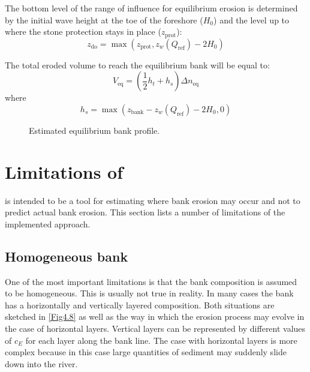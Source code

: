 The bottom level of the range of influence for equilibrium erosion is determined by the initial wave height at the toe of the foreshore ($H_0$) and the level up to where the stone protection stays in place ($z_\text{prot}$):
\begin{equation}
z_\text{do} = \max (z_\text{prot}, z_w(Q_\text{ref}) - 2 H_0 )
\end{equation}	

The total eroded volume to reach the equilibrium bank will be equal to:
\begin{equation}
V_\text{eq} = ( \frac{1}{2} h_t + h_s ) \Delta n_\text{eq}
\end{equation}
where 
\begin{equation}
h_s = \max ( z_\text{bank} - z_w(Q_\text{ref}) - 2 H_0, 0)
\end{equation}

\begin{figure}[!h]
\center
\resizebox{14cm}{!}{
   
}
\caption{Estimated equilibrium bank profile.}
\label{Fig4.7}
\end{figure}

\section{Limitations of \dfastbe} \label{Sec4.7}

\dfastbe is intended to be a tool for estimating where bank erosion may occur and not to predict actual bank erosion.
This section lists a number of limitations of the implemented approach.

\subsection{Homogeneous bank}

One of the most important limitations is that the bank composition is assumed to be homogeneous.
This is usually not true in reality.
In many cases the bank has a horizontally and vertically layered composition.
Both situations are sketched in \autoref{Fig4.8} as well as the way in which the erosion process may evolve in the case of horizontal layers.
Vertical layers can be represented by different values of $c_E$ for each layer along the bank line.
The case with horizontal layers is more complex because in this case large quantities of sediment may suddenly slide down into the river.

